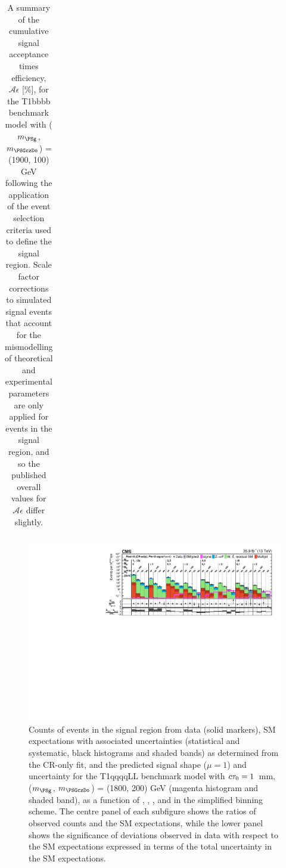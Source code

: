\begin{table}[p]
\begin{center}
\begin{tabular}{lrr}
      \hline
        \end{tabular}
        \caption{A summary of the cumulative signal acceptance times
        efficiency, $\mathcal{A}\epsilon$ [\%], for the
        T1bbbb benchmark model with ($m_{\PSg}$, $m_{\PSGczDo}$) = (1900, 100) GeV
        following the application of
        the event selection criteria used to define the signal region.  Scale
        factor corrections to simulated signal events that account for the
        mismodelling of theoretical and experimental parameters are only
        applied for events in the signal region, and so the published overall
        values for $\mathcal{A}\epsilon$ differ slightly.
}
        \label{tab:T1bbbb_1900_100_MR_sig}
    \end{center}
\end{table}

\begin{figure}[p]
    \begin{center}
        \includegraphics[width=1.00\textwidth]{Supplementary/CMS-SUS-16-038_Figure-aux_030.pdf}
  \caption{Counts of events in the signal region from data (solid markers), SM expectations
    with associated uncertainties (statistical and systematic, black
    histograms and shaded bands) as determined from the CR-only fit,
    and the predicted signal shape ($\mu=1$) and uncertainty for the
        T1qqqqLL benchmark model with $c\tau_{0}=1$~mm, ($m_{\PSg}$, $m_{\PSGczDo}$) = (1800, 200) GeV
        (magenta histogram and shaded band),
    as a function of \njet, \nb, \scalht, and \mht in the simplified binning scheme.
    The centre panel of each subfigure shows the ratios of
    observed counts and the SM expectations, while the lower panel
    shows the significance of deviations observed in data with respect
    to the SM expectations expressed in terms of the total uncertainty
    in the SM expectations.  }
        \label{fig:T1qqqqLL_1_1800_200_MR_sig}
    \end{center}
\end{figure}

